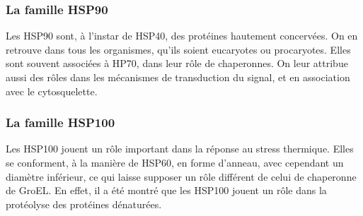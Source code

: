 \subsubsection{La famille HSP90} %
\label{ssub:la_famille_hsp90}


  Les HSP90 sont, à l'instar de HSP40, des protéines hautement concervées. On
  en retrouve dans tous les organismes, qu’ils soient eucaryotes ou
  procaryotes. Elles sont souvent associées à HP70, dans leur rôle de
  chaperonnes. On leur attribue aussi des rôles dans les mécanismes de
  transduction du signal, et en association avec le cytosquelette.

\subsubsection{La famille HSP100} %
\label{ssub:la_famille_hsp100}

Les HSP100 jouent un rôle important dans la réponse au stress thermique. %
Elles se conforment, à la manière de HSP60, en forme d’anneau, avec cependant un diamètre inférieur, ce qui laisse supposer un rôle différent de celui de chaperonne de GroEL.
En effet, il a été montré que les HSP100 jouent un rôle dans la protéolyse des protéines dénaturées.

%
